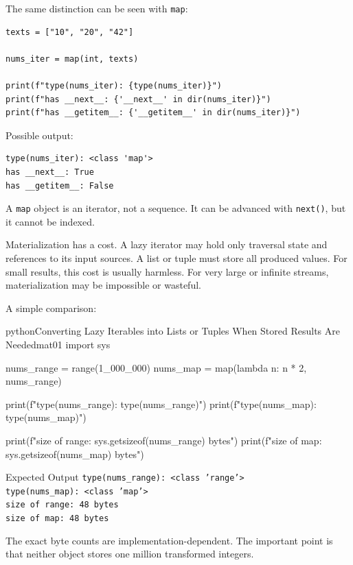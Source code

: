 \documentclass[a4paper,twoside]{report}
\begin{document}
The same distinction can be seen with \texttt{map}:

\begin{verbatim}
texts = ["10", "20", "42"]

nums_iter = map(int, texts)

print(f"type(nums_iter): {type(nums_iter)}")
print(f"has __next__: {'__next__' in dir(nums_iter)}")
print(f"has __getitem__: {'__getitem__' in dir(nums_iter)}")
\end{verbatim}

Possible output:

\begin{verbatim}
type(nums_iter): <class 'map'>
has __next__: True
has __getitem__: False
\end{verbatim}

A \texttt{map} object is an iterator, not a sequence. It can be advanced with \texttt{next()}, but it cannot be indexed.

Materialization has a cost. A lazy iterator may hold only traversal state and references to its input sources. A list or tuple must store all produced values. For small results, this cost is usually harmless. For very large or infinite streams, materialization may be impossible or wasteful.

A simple comparison:

\begin{codebox}[]{python}{Converting Lazy Iterables into Lists or Tuples When Stored Results Are Needed}{mat01}
import sys

nums_range = range(1_000_000)
nums_map = map(lambda n: n * 2, nums_range)

print(f"type(nums_range): {type(nums_range)}")
print(f"type(nums_map): {type(nums_map)}")

print(f"size of range: {sys.getsizeof(nums_range)} bytes")
print(f"size of map:   {sys.getsizeof(nums_map)} bytes")
\end{codebox}


\begin{iobox}{Expected Output}
\texttt{type(nums\_range): <class 'range'>} \\
\texttt{type(nums\_map): <class 'map'>} \\
\texttt{size of range: 48 bytes} \\
\texttt{size of map:   48 bytes} \\
\end{iobox}


The exact byte counts are implementation-dependent. The important point is that neither object stores one million transformed integers.
\end{document}
